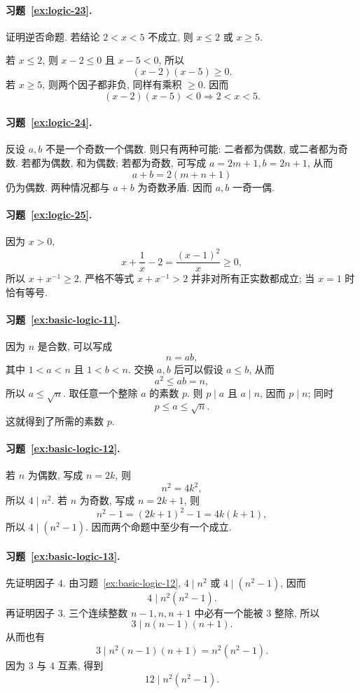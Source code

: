\documentclass[usesamecnt, thmcnt=section, lang=cn, newtx, 10pt, scheme=chinese]{elegantbook}
\begin{document}
\paragraph*{习题~\ref{ex:logic-23}.}
证明逆否命题. 若结论 $2<x<5$ 不成立, 则 $x\leq2$ 或 $x\geq5$.

若 $x\leq2$, 则 $x-2\leq0$ 且 $x-5<0$, 所以
\[
 (x-2)(x-5)\geq0.
\]
若 $x\geq5$, 则两个因子都非负, 同样有乘积 $\geq0$. 因而
\[
 (x-2)(x-5)<0\Rightarrow2<x<5.
\]

\paragraph*{习题~\ref{ex:logic-24}.}
反设 $a,b$ 不是一个奇数一个偶数. 则只有两种可能: 二者都为偶数, 或二者都为奇数. 若都为偶数, 和为偶数; 若都为奇数, 可写成 $a=2m+1,b=2n+1$, 从而
\[
 a+b=2(m+n+1)
\]
仍为偶数. 两种情况都与 $a+b$ 为奇数矛盾. 因而 $a,b$ 一奇一偶.

\paragraph*{习题~\ref{ex:logic-25}.}
因为 $x>0$,
\[
 x+\frac1x-2=\frac{(x-1)^2}{x}\geq0,
\]
所以 $x+x^{-1}\geq2$. 严格不等式 $x+x^{-1}>2$ 并非对所有正实数都成立; 当 $x=1$ 时恰有等号.

\paragraph*{习题~\ref{ex:basic-logic-11}.}
因为 $n$ 是合数, 可以写成
\[
 n=ab,
\]
其中 $1<a<n$ 且 $1<b<n$. 交换 $a,b$ 后可以假设 $a\leq b$, 从而
\[
 a^2\leq ab=n,
\]
所以 $a\leq\sqrt n$. 取任意一个整除 $a$ 的素数 $p$. 则 $p\mid a$ 且 $a\mid n$, 因而 $p\mid n$; 同时
\[
 p\leq a\leq\sqrt n.
\]
这就得到了所需的素数 $p$.

\paragraph*{习题~\ref{ex:basic-logic-12}.}
若 $n$ 为偶数, 写成 $n=2k$, 则
\[
 n^2=4k^2,
\]
所以 $4\mid n^2$. 若 $n$ 为奇数, 写成 $n=2k+1$, 则
\[
 n^2-1=(2k+1)^2-1=4k(k+1),
\]
所以 $4\mid(n^2-1)$. 因而两个命题中至少有一个成立.

\paragraph*{习题~\ref{ex:basic-logic-13}.}
先证明因子 $4$. 由习题~\ref{ex:basic-logic-12}, $4\mid n^2$ 或 $4\mid(n^2-1)$, 因而
\[
 4\mid n^2(n^2-1).
\]
再证明因子 $3$. 三个连续整数 $n-1,n,n+1$ 中必有一个能被 $3$ 整除, 所以
\[
 3\mid n(n-1)(n+1).
\]
从而也有
\[
 3\mid n^2(n-1)(n+1)=n^2(n^2-1).
\]
因为 $3$ 与 $4$ 互素, 得到
\[
 12\mid n^2(n^2-1).
\]
\end{document}
